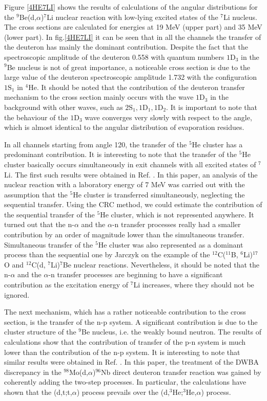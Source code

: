 \documentclass[10pt]{iopart}
\begin{document}
 
Figure \ref{4HE7LI} shows the results of calculations of the angular distributions  for the $^9$Be(d,$\alpha$)$^7$Li nuclear reaction with low-lying excited states of the $^7$Li nucleus. The cross sections are calculated for energies at 19 MeV (upper part) and 35 MeV (lower part). In fig.\ref{4HE7LI}  it can be seen that in all the channels the transfer of the deuteron  has mainly the dominant contribution. Despite the fact that the spectroscopic amplitude of the deuteron 0.558 with quantum numbers ${1\textrm{D}_3}$ \cite{bodek1989} in the $^9$Be nucleus is not of great importance, a noticeable cross section is due to the large value of the deuteron spectroscopic amplitude  1.732 with the configuration ${1\textrm{S}_1}$ in $^4$He. It should be noted that the contribution of the deuteron transfer mechanism to the cross section mainly occurs with the wave ${1\textrm{D}_3}$ in the background with other waves, such as ${2\textrm{S}_1}, 1\textrm{D}_1, 1\textrm{D}_2$. It is important to note that the behaviour of the ${1\textrm{D}_3}$ wave converges very slowly with respect to the angle, which is almost identical to the angular distribution of evaporation residues.

In all channels starting from angle 120, the transfer of the $^5$He cluster has a predominant contribution.
It is interesting to note that the transfer of the $^5$He cluster  basically occurs simultaneously in exit channels with all excited states of $^7$Li. The first such results were obtained in Ref. \cite{bodek1989} . In this paper, an analysis of the nuclear reaction with a laboratory energy of 7 MeV was carried out with the assumption that the $^5$He cluster  is transferred simultaneously, neglecting the sequential transfer. Using the CRC method, we could estimate the contribution of the sequential transfer of the $^5$He cluster, which is not represented anywhere. It turned out that the n-$\alpha$ and the $\alpha$-n transfer processes really had a smaller contribution by an order of magnitude lower than the simultaneous transfer. Simultaneous transfer of the $^5$He cluster was also represented as a dominant process than the sequential one by Jarczyk \etal \cite{jarczyk1996} on the example of the $^{12}$C($^{11}$B, $^6$Li)$^{17}$O and $^{12}$C(d, $^7$Li)$^{7}$Be nuclear reactions. Nevertheless, it should be noted that  the n-$\alpha$ and the $\alpha$-n transfer processes are beginning to have a significant contribution as the excitation energy of $^7$Li increases, where they should not be ignored.

The next mechanism, which has a rather noticeable contribution to the cross section, is the transfer of the n-p system. A significant contribution is due to the cluster structure of the $^9$Be nucleus, i.e. the weakly bound neutron. The results of calculations show that the contribution of transfer of  the p-n system is much lower than the contribution of the n-p system. It is interesting to note that similar results were obtained in Ref. \cite{coker1974}. In this paper, the treatment of the DWBA discrepancy in the $^{98}$Mo(d,$\alpha$)$^{96}$Nb direct deuteron transfer reaction was gained by coherently adding the two-step processes. In particular, the calculations have shown that the (d,t;t,$\alpha$) process prevails over the (d,$^3$He;$^3$He,$\alpha$) process.
\end{document}
